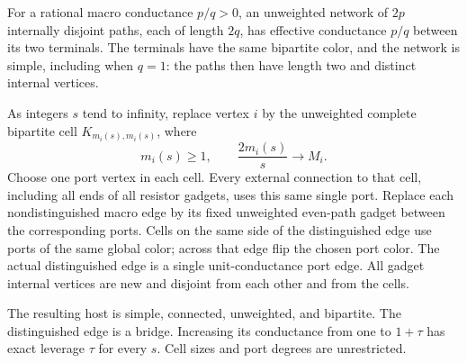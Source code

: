 For a rational macro conductance $p/q>0$, an unweighted network of
$2p$ internally disjoint paths, each of length $2q$, has effective
conductance $p/q$ between its two terminals. The terminals have the
same bipartite color, and the network is simple, including when $q=1$:
the paths then have length two and distinct internal vertices.

As integers $s$ tend to infinity, replace vertex $i$ by the
unweighted complete bipartite cell $K_{m_i(s),m_i(s)}$, where
\[
 m_i(s)\ge1,\qquad \frac{2m_i(s)}s\longrightarrow M_i.
\]
Choose one port vertex in each cell. Every external connection to
that cell, including all ends of all resistor gadgets, uses this
same single port. Replace each nondistinguished macro edge by its
fixed unweighted even-path gadget between the corresponding ports.
Cells on the same side of the distinguished edge use ports of the
same global color; across that edge flip the chosen port color.
The actual distinguished edge is a single unit-conductance port edge.
All gadget internal vertices are new and disjoint from each other and
from the cells.

The resulting host is simple, connected, unweighted, and bipartite.
The distinguished edge is a bridge. Increasing its conductance from
one to $1+\tau$ has exact leverage $\tau$ for every $s$.
Cell sizes and port degrees are unrestricted.

